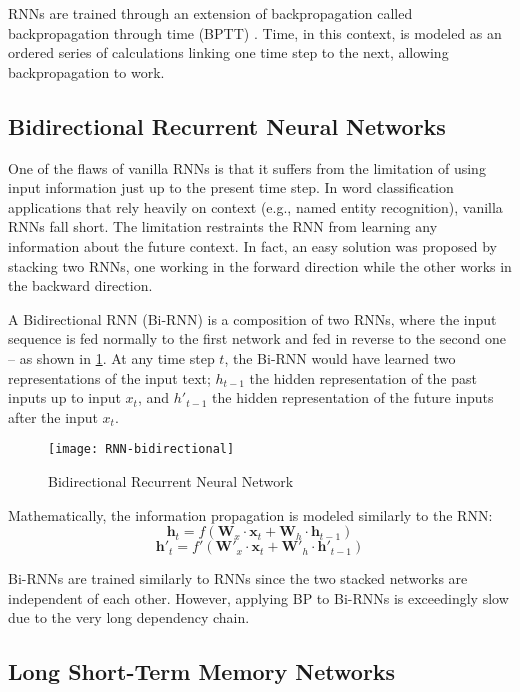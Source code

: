 RNNs are trained through an extension of backpropagation called backpropagation through time (BPTT) \citep{werbos1988generalization}. Time, in this context, is modeled as an ordered series of calculations linking one time step to the next, allowing backpropagation to work.


\subsection{Bidirectional Recurrent Neural Networks}
\label{sec:birnns}

One of the flaws of vanilla RNNs is that it suffers from the limitation of using input information just up to the present time step. In word classification applications that rely heavily on context (e.g., named entity recognition), vanilla RNNs fall short. The limitation restraints the RNN from learning any information about the future context. In fact, an easy solution was proposed \citep{schuster1997bidirectional} by stacking two RNNs, one working in the forward direction while the other works in the backward direction.

A Bidirectional RNN (Bi-RNN) is a composition of two RNNs, where the input sequence is fed normally to the first network and fed in reverse to the second one -- as shown in \cref{fig:bi_rnn}. At any time step $t$, the Bi-RNN would have learned two representations of the input text; $h_{t-1}$ the hidden representation of the past inputs up to input $x_t$, and $h'_{t-1}$ the hidden representation of the future inputs after the input $x_t$.

\begin{figure}[ht]
\centering
\texttt{[image: RNN-bidirectional]}
\caption{Bidirectional Recurrent Neural Network \protect\footnotemark}
\label{fig:bi_rnn}
\end{figure}

Mathematically, the information propagation is modeled similarly to the RNN:
\[ \mathbf{h}_t = f (\mathbf{W}_x \cdot \mathbf{x}_t + \mathbf{W}_h \cdot \mathbf{h}_{t-1}) \]
\[ \mathbf{h}'_t = f' (\mathbf{W}'_x \cdot \mathbf{x}_t + \mathbf{W}'_h \cdot \mathbf{h}'_{t-1}) \]

Bi-RNNs are trained similarly to RNNs since the two stacked networks are independent of each other. However, applying BP to Bi-RNNs is exceedingly slow due to the very long dependency chain.

\subsection{Long Short-Term Memory Networks}
\label{sec:lstms}

